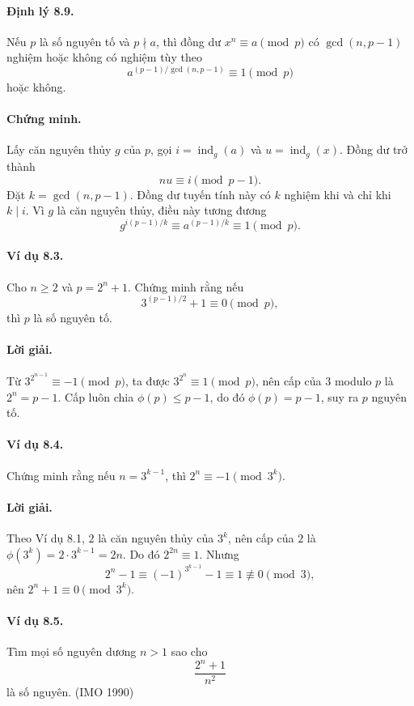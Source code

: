 \documentclass[11pt]{article}
\DeclareMathOperator{\ind}{ind}
\begin{document}
\paragraph{Định lý 8.9.}
Nếu \(p\) là số nguyên tố và \(p\nmid a\), thì đồng dư \(x^n\equiv a\pmod p\)
có \(\gcd(n,p-1)\) nghiệm hoặc không có nghiệm tùy theo
\[
 a^{(p-1)/\gcd(n,p-1)}\equiv1\pmod p
\]
hoặc không.

\paragraph{Chứng minh.}
Lấy căn nguyên thủy \(g\) của \(p\), gọi \(i=\ind_g(a)\) và \(u=\ind_g(x)\).
Đồng dư trở thành
\[
 nu\equiv i\pmod{p-1}.
\]
Đặt \(k=\gcd(n,p-1)\). Đồng dư tuyến tính này có \(k\) nghiệm khi và chỉ khi
\(k\mid i\). Vì \(g\) là căn nguyên thủy, điều này tương đương
\[
 g^{i(p-1)/k}\equiv a^{(p-1)/k}\equiv1\pmod p.
\]

\paragraph{Ví dụ 8.3.}
Cho \(n\ge2\) và \(p=2^n+1\). Chứng minh rằng nếu
\[
 3^{(p-1)/2}+1\equiv0\pmod p,
\]
thì \(p\) là số nguyên tố.

\paragraph{Lời giải.}
Từ \(3^{2^{n-1}}\equiv-1\pmod p\), ta được \(3^{2^n}\equiv1\pmod p\), nên cấp
của \(3\) modulo \(p\) là \(2^n=p-1\). Cấp luôn chia \(\phi(p)\le p-1\), do đó
\(\phi(p)=p-1\), suy ra \(p\) nguyên tố.

\paragraph{Ví dụ 8.4.}
Chứng minh rằng nếu \(n=3^{k-1}\), thì \(2^n\equiv-1\pmod{3^k}\).

\paragraph{Lời giải.}
Theo Ví dụ 8.1, \(2\) là căn nguyên thủy của \(3^k\), nên cấp của \(2\) là
\(\phi(3^k)=2\cdot3^{k-1}=2n\). Do đó \(2^{2n}\equiv1\). Nhưng
\[
 2^n-1\equiv(-1)^{3^{k-1}}-1\equiv1\not\equiv0\pmod3,
\]
nên \(2^n+1\equiv0\pmod{3^k}\).

\paragraph{Ví dụ 8.5.}
Tìm mọi số nguyên dương \(n>1\) sao cho
\[
 \frac{2^n+1}{n^2}
\]
là số nguyên. (IMO 1990)
\end{document}
